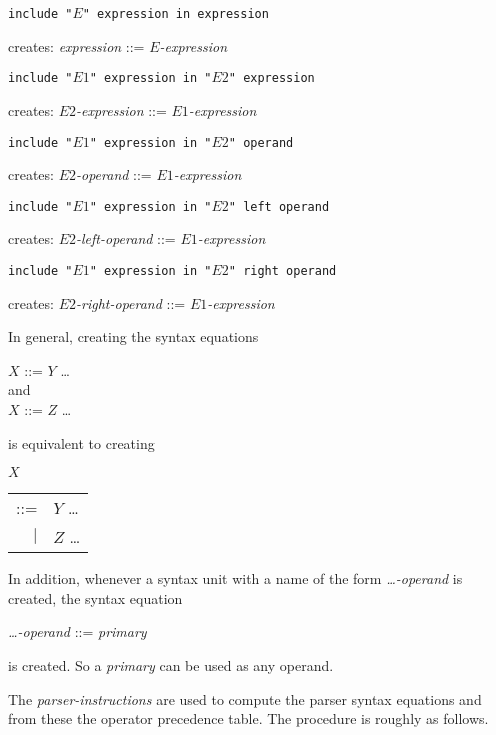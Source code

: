 \documentclass[12pt]{article}
\newenvironment{indpar}[1][0.3in]%
	{\begin{list}{}%
		     {\setlength{\itemsep}{0in}%
		      \setlength{\topsep}{0in}%
		      \setlength{\parsep}{1ex}%
		      \setlength{\labelwidth}{#1}%
		      \setlength{\leftmargin}{#1}%
		      \addtolength{\leftmargin}{\labelsep}}%
	 \item}%
	{\end{list}}
\begin{document}
\begin{indpar}

{\tt include "$E$" expression in expression}
\begin{indpar}
creates: {\em expression} ::= {\em $E$-expression}
\end{indpar}

{\tt include "$E1$" expression in "$E2$" expression}
\begin{indpar}
creates: {\em $E2$-expression} ::= {\em $E1$-expression}
\end{indpar}

{\tt include "$E1$" expression in "$E2$" operand}
\begin{indpar}
creates: {\em $E2$-operand} ::= {\em $E1$-expression}
\end{indpar}

{\tt include "$E1$" expression in "$E2$" left operand}
\begin{indpar}
creates: {\em $E2$-left-operand} ::= {\em $E1$-expression}
\end{indpar}

{\tt include "$E1$" expression in "$E2$" right operand}
\begin{indpar}
creates: {\em $E2$-right-operand} ::= {\em $E1$-expression}
\end{indpar}

\end{indpar}

In general, creating the syntax equations
\begin{center}
$X$ ::= $Y$ \ldots \\
and \\
$X$ ::= $Z$ \ldots \\
\end{center}
is equivalent to creating
\begin{center}
$X$ \begin{tabular}[t]{rl}
    ::= & $Y$ \ldots \\
    $|$ & $Z$ \ldots \\
    \end{tabular}
\end{center}

In addition, whenever a syntax unit with a name of the
form {\em \ldots-operand} is created, the syntax equation
\begin{center}
{\em \ldots-operand} ::= {\em primary}
\end{center}
is created.  So a {\em primary} can be used as any operand.

The {\em parser-instructions} are used to compute the parser
syntax equations and from these the operator
precedence table.  The procedure is roughly as follows.
\end{document}
